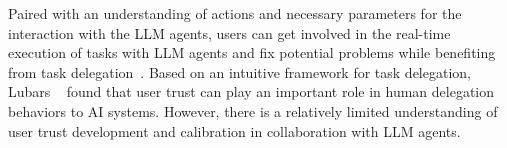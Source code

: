 Paired with an understanding of actions and necessary parameters for the interaction with the LLM agents, users can get involved in the real-time execution of tasks with LLM agents and fix potential problems while benefiting from task delegation~\cite{lubars2019ask}. {Based on an intuitive framework for task delegation, Lubars \etal~\cite{lubars2019ask} found that user trust can play an important role in human delegation behaviors to AI systems. However, there is a relatively limited understanding of user trust development and calibration in collaboration with LLM agents.} 




